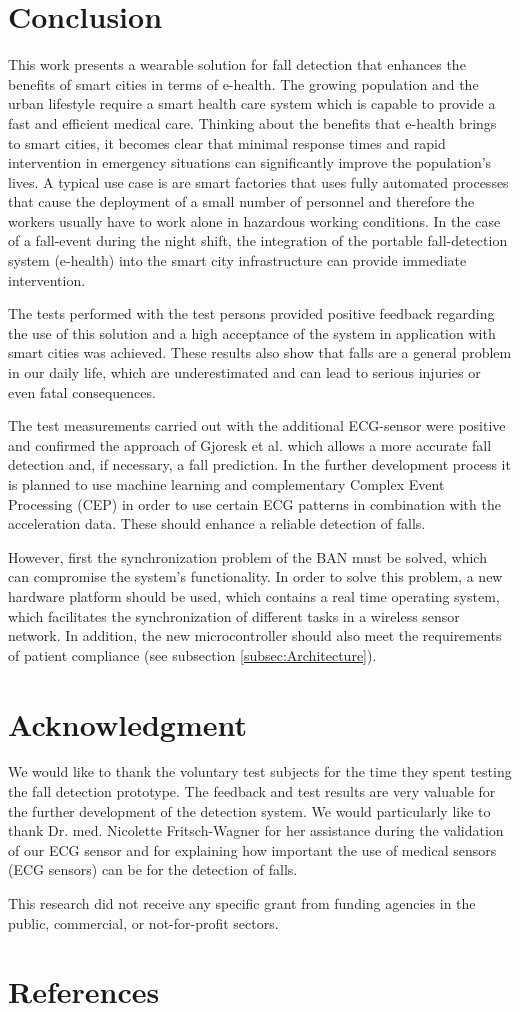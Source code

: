 \documentclass[review]{elsarticle}
\begin{document}
\section{Conclusion}
\label{sec:conclusion}
This work presents a wearable solution for fall detection that enhances the benefits of smart cities in terms of e-health. The growing population and the urban lifestyle require a smart health care system which is capable to provide a fast and efficient medical care. Thinking about the benefits that e-health brings to smart cities, it becomes clear that minimal response times and rapid intervention in emergency situations can significantly improve the population's lives. A typical use case is are smart factories that uses fully automated processes that cause the deployment of a small number of personnel and therefore the workers usually have to work alone in hazardous working conditions. In the case of a fall-event during the night shift, the integration of the portable fall-detection system (e-health) into the smart city infrastructure can provide immediate intervention. 

The tests performed with the test persons provided positive feedback regarding the use of this solution and a high acceptance of the system in application with smart cities was achieved. These results also show that falls are a general problem in our daily life, which are underestimated and can lead to serious injuries or even fatal consequences. 

The test measurements carried out with the additional ECG-sensor were positive and confirmed the approach of Gjoresk et al. \cite{Gjoreski2014} which allows a more accurate fall detection and, if necessary, a fall prediction. In the further development process it is planned to use machine learning and complementary Complex Event Processing (CEP) in order to use certain ECG patterns in combination with the acceleration data. These should enhance a reliable detection of falls.

However, first the synchronization problem of the BAN must be solved, which can compromise the system's functionality. In order to solve this problem, a new hardware platform should be used, which contains a real time operating system, which facilitates the synchronization of different tasks in a wireless sensor network. In addition, the new microcontroller should also meet the requirements of patient compliance (see subsection \ref{subsec:Architecture}).



\section*{Acknowledgment}
We would like to thank the voluntary test subjects for the time they spent testing the fall detection prototype. The feedback and test results are very valuable for the further development of the detection system. We would particularly like to thank Dr. med. Nicolette Fritsch-Wagner for her assistance during the validation of our ECG sensor and for explaining how important the use of medical sensors (ECG sensors) can be for the detection of falls. 

This research did not receive any specific grant from funding agencies in the public, commercial, or not-for-profit sectors.


\section*{References}


\end{document}

